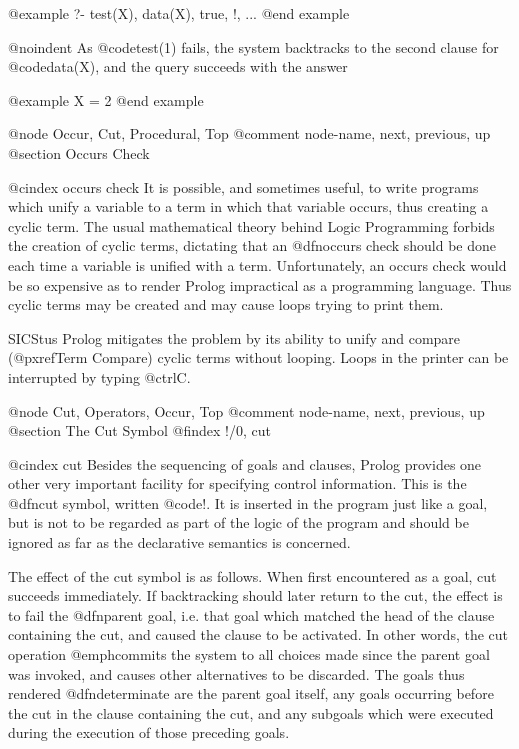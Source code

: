 {@example
?- test(X), data(X), true, !, ...
@end example

@noindent
As @code{test(1)} fails, the system backtracks to the second clause for
@code{data(X)}, and the query succeeds with the answer

@example
X = 2
@end example


@node Occur, Cut, Procedural, Top
@comment  node-name,  next,  previous,  up
@section Occurs Check

@cindex occurs check
It is possible, and sometimes useful, to write programs which unify a
variable to a term in which that variable occurs, thus creating a cyclic
term.  The usual mathematical theory behind Logic Programming forbids
the creation of cyclic terms, dictating that an @dfn{occurs check}
should be done each time a variable is unified with a term.
Unfortunately, an occurs check would be so expensive as to render Prolog
impractical as a programming language.  Thus cyclic terms may be created
and may cause loops trying to print them.

SICStus Prolog mitigates the problem by its ability to unify and compare
(@pxref{Term Compare}) cyclic terms without looping.  Loops in the
printer can be interrupted by typing @ctrl{C}.

@node Cut, Operators, Occur, Top
@comment  node-name,  next,  previous,  up
@section The Cut Symbol
@findex !/0, cut

@cindex cut
Besides the sequencing of goals and clauses, Prolog provides one other
very important facility for specifying control information.  This is the
@dfn{cut} symbol, written @code{!}.  It is inserted in the program just
like a goal, but is not to be regarded as part of the logic of the
program and should be ignored as far as the declarative semantics is
concerned.

The effect of the cut symbol is as follows.  When first encountered as a
goal, cut succeeds immediately.  If backtracking should later return to
the cut, the effect is to fail the @dfn{parent goal}, i.e. that goal
which matched the head of the clause containing the cut, and caused the
clause to be activated.  In other words, the cut operation
@emph{commits} the system to all choices made since the parent goal was
invoked, and causes other alternatives to be discarded.  The goals thus
rendered @dfn{determinate} are the parent goal itself, any goals
occurring before the cut in the clause containing the cut, and any
subgoals which were executed during the execution of those preceding
goals.

}
